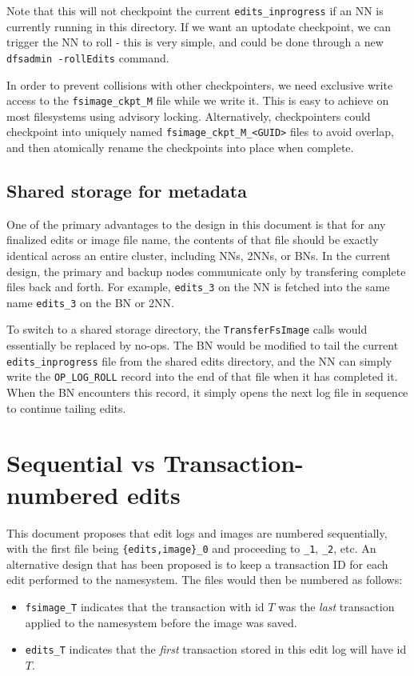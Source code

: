 \documentclass{article}
\begin{document}
Note that this will not checkpoint the current {\tt edits\_inprogress} if an NN is currently running in this directory. If we want an uptodate checkpoint, we can trigger the NN to roll - this is very simple, and could be done through a new {\tt dfsadmin -rollEdits} command.

In order to prevent collisions with other checkpointers, we need exclusive write access to the {\tt fsimage\_ckpt\_M} file while we write it. This is easy to achieve on most filesystems using advisory locking. Alternatively, checkpointers could checkpoint into uniquely named {\tt fsimage\_ckpt\_M\_<GUID>} files to avoid overlap, and then atomically rename the checkpoints into place when complete.

\subsection{Shared storage for metadata}

One of the primary advantages to the design in this document is that for any finalized edits or image file name, the contents of that file should be exactly identical across an entire cluster, including NNs, 2NNs, or BNs. In the current design, the primary and backup nodes communicate only by transfering complete files back and forth. For example, {\tt edits\_3} on the NN is fetched into the same name {\tt edits\_3} on the BN or 2NN.

  To switch to a shared storage directory, the {\tt TransferFsImage} calls would essentially be replaced by no-ops. The BN would be modified to tail the current {\tt edits\_inprogress} file from the shared edits directory, and the NN can simply write the {\tt OP\_LOG\_ROLL} record into the end of that file when it has completed it. When the BN encounters this record, it simply opens the next log file in sequence to continue tailing edits.

\section{Sequential vs Transaction-numbered edits}

This document proposes that edit logs and images are numbered sequentially, with the first file being {\tt \{edits,image\}\_0} and proceeding to {\tt \_1}, {\tt \_2}, etc. An alternative design that has been proposed is to keep a transaction ID for each edit performed to the namesystem. The files would then be numbered as follows:
\begin{itemize}
\item {\tt fsimage\_T} indicates that the transaction with id $T$ was the {\em last} transaction applied to the namesystem before the image was saved.
\item {\tt edits\_T} indicates that the {\em first} transaction stored in this edit log will have id $T$.
\end{itemize}
\end{document}
